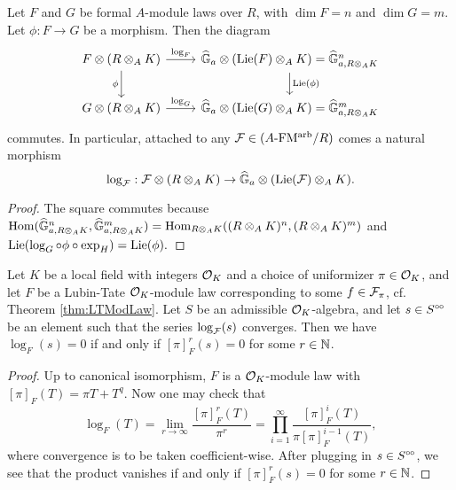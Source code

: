 \begin{lem}
  Let $F$ and $G$ be formal $A$-module laws over $R$, with $\dim F = n$ and
  $\dim G = m$. 
  Let $\phi: F \to G$ be a morphism. Then the diagram 
  \begin{equation*}
  \begin{tikzcd}[ampersand replacement=\&]
    {F \otimes(R \otimes_A K)} \& {\GG_a \otimes (\Lie(F)} \otimes_A K) =
    \GG_{a, R\otimes_AK}^n \\
    {G \otimes(R \otimes_A K)} \& {\GG_a \otimes (\Lie(G)} \otimes_A K) =
    \GG_{a, R\otimes_AK}^m
  	\arrow["{\log_F}", from=1-1, to=1-2]
  	\arrow["\phi"', from=1-1, to=2-1]
  	\arrow["{\Lie(\phi)}", from=1-2, to=2-2]
  	\arrow["{\log_G}", from=2-1, to=2-2]
  \end{tikzcd}
  \end{equation*}
  commutes. In particular, attached to any $\mathcal{F} \in {({A}\text-\mathrm{FM^{arb}}/{R})}$ comes a 
  natural morphism 
  $$\log_{\mathcal{F}}: \mathcal{F} \otimes (R \otimes_A K) \to \widehat{\mathbb{G}}_a \otimes (\operatorname{Lie}(\mathcal{F}) \otimes_A K).$$
  \begin{proof}
    The square commutes because $\operatorname{Hom}(\widehat{\mathbb{G}}_{a, R\otimes_AK}^n, \widehat{\mathbb{G}}_{a,
    R\otimes_AK}^m) = \operatorname{Hom}_{R \otimes_A K}((R\otimes_A K)^n, (R\otimes_A K)^m)$
    and $\operatorname{Lie}(\log_G \circ \phi \circ \exp_H) = \operatorname{Lie}(\phi).$
  \end{proof}
\end{lem}

\begin{lem}\label{lem:KernelOfLog}
  Let $K$ be a local field with integers $\mathcal{O}_K$ and a choice of uniformizer $\pi \in \mathcal{O}_K$, 
  and let $F$ be a Lubin-Tate $\mathcal{O}_K$-module law corresponding to some 
  $f \in \mathcal{F}_\pi$, cf. Theorem \ref{thm:LTModLaw}. Let $S$ be an admissible 
  $\mathcal{O}_K$-algebra, and let $s \in S^{\circ \hspace{-0.5pt} \circ}$ be an element such that the
  series $\log_{\mathcal{F}}(s)$ 
  converges. Then we have $\log_F(s) = 0$ if and only if $[\pi]^r_F(s) = 0$ for
  some $r \in \mathbb{N}$. 
\begin{proof}
  Up to canonical isomorphism, $F$ is a $\mathcal{O}_K$-module law with $[\pi]_F(T) =
  \pi T + T^q$. Now one may check that 
  \begin{equation*}
    \log_F(T) = \lim_{r \to \infty} \frac{ [\pi]_F^r(T) }{\pi^r} = \prod_{i=1}^\infty 
    \frac{[\pi]^i_F(T)}{\pi [\pi]^{i-1}_F(T)},
  \end{equation*}
  where convergence is to be taken coefficient-wise. After plugging in 
  $s \in S^{\circ \hspace{-0.5pt} \circ}$, we see that the product vanishes if and only if $[\pi]_F^r(s) = 0$
  for some $r \in \mathbb{N}$. 
\end{proof}
\end{lem}
